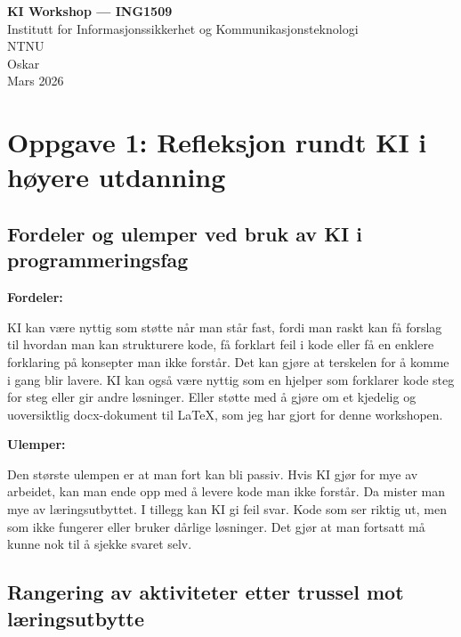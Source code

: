 \documentclass[12pt,a4paper]{article}
\begin{document}
\begin{titlepage}
    \centering
    \vspace*{2cm}
    {\LARGE \textbf{KI Workshop --- ING1509}}\\[1cm]
    {\large Institutt for Informasjonssikkerhet og Kommunikasjonsteknologi}\\[0.5cm]
    {\large NTNU}\\[2cm]
    {\large Oskar}\\[0.5cm]
    {\large Mars 2026}\\[3cm]
    \vfill
\end{titlepage}

\tableofcontents
\newpage

\section{Oppgave 1: Refleksjon rundt KI i høyere utdanning}

\subsection*{Fordeler og ulemper ved bruk av KI i programmeringsfag}

\textbf{Fordeler:}

KI kan være nyttig som støtte når man står fast, fordi man raskt kan få forslag til hvordan
man kan strukturere kode, få forklart feil i kode eller få en enklere forklaring på konsepter
man ikke forstår. Det kan gjøre at terskelen for å komme i gang blir lavere. KI kan også være
nyttig som en hjelper som forklarer kode steg for steg eller gir andre løsninger. Eller støtte
med å gjøre om et kjedelig og uoversiktlig docx-dokument til \LaTeX, som jeg har gjort for
denne workshopen.

\textbf{Ulemper:}

Den største ulempen er at man fort kan bli passiv. Hvis KI gjør for mye av arbeidet, kan man
ende opp med å levere kode man ikke forstår. Da mister man mye av læringsutbyttet. I
tillegg kan KI gi feil svar. Kode som ser riktig ut, men som ikke fungerer eller bruker dårlige
løsninger. Det gjør at man fortsatt må kunne nok til å sjekke svaret selv.

\subsection*{Rangering av aktiviteter etter trussel mot læringsutbytte}
\end{document}

